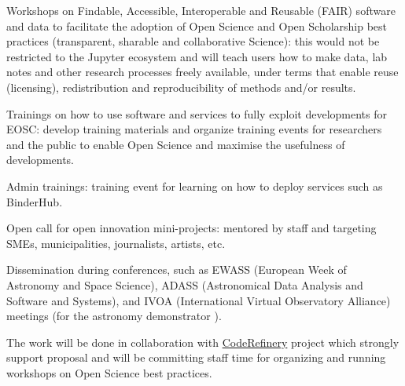 \begin{task}[
  title=Training Workshops and community building,
  id=workshops,
  lead=UIO,
  PM=36,
  wphases={0-36!.75},
  partners={SRL}
]
\begin{compactitem}
   \item Workshops on Findable, Accessible, Interoperable and Reusable (FAIR) software and data to facilitate the adoption of Open Science and Open Scholarship best practices (transparent, sharable and collaborative Science): this would not be restricted to the Jupyter ecosystem and will teach users how to make data, lab notes and other research processes freely available, under terms that enable reuse (licensing), redistribution and reproducibility of methods and/or results.

   \item Trainings on how to use \TheProject software and services to fully exploit \TheProject developments for EOSC: develop training materials and organize training events for researchers and the public to enable Open Science and maximise the usefulness of \TheProject developments.

   \item \TheProject Admin trainings: training event for learning on how to deploy \TheProject services such as BinderHub.


   \item Open call for open innovation mini-projects: mentored by \TheProject staff and targeting SMEs, municipalities, journalists, artists, etc.

   \item Dissemination during conferences, such as EWASS (European Week of 
         Astronomy and Space Science), ADASS (Astronomical Data Analysis and 
         Software and Systems), and IVOA (International Virtual Observatory
         Alliance) meetings (for the astronomy demonstrator 
         ).

  \end{compactitem}
 The work will be done in collaboration with \href{https://coderefinery.org}{CodeRefinery} project which strongly support \TheProject proposal and will be committing staff time for organizing and running workshops on Open Science best practices. 
\end{task}
